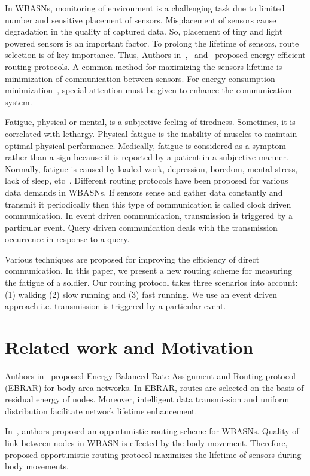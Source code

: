 \documentclass[journal]{IEEEtran}
\begin{document}
In WBASNs, monitoring of environment is a challenging task due to limited number and sensitive placement of sensors. Misplacement of sensors cause degradation
in the quality of captured data. So, placement of tiny and light powered sensors is an important factor. To prolong the lifetime of sensors, route selection is of
key importance. Thus, Authors in~\cite{1},~\cite{2} and~\cite{3} proposed energy efficient routing protocols. A common method for maximizing the sensors lifetime is
minimization of communication between sensors. For energy consumption minimization~\cite{4}, special attention must be given to enhance the communication system.

Fatigue, physical or mental, is a subjective feeling of tiredness. Sometimes, it is correlated with lethargy. Physical fatigue is the inability of muscles to
maintain optimal physical performance. Medically, fatigue is considered as a symptom rather than a sign because it is reported by a patient in a subjective manner.
Normally, fatigue is caused by loaded work, depression, boredom, mental stress, lack of sleep, etc~\cite{5}. Different routing protocols have been proposed for
 various data demands in WBASNs. If sensors sense and gather data constantly and transmit it periodically then this type of communication is called clock driven
 communication. In event driven communication, transmission is triggered by a particular event. Query driven communication deals with the transmission
occurrence in response to a query.

Various techniques are proposed for improving the efficiency of direct communication. In this paper, we present a new routing scheme for measuring the fatigue
 of a soldier. Our routing protocol takes three scenarios into account: (1) walking (2) slow running and (3) fast running. We use an event driven approach i.e.
 transmission is triggered by a particular event.


\section{Related work and Motivation}

Authors in~\cite{6} proposed Energy-Balanced Rate Assignment and Routing protocol (EBRAR) for body area networks. In EBRAR, routes are selected on the basis of
residual energy of nodes. Moreover, intelligent data transmission and uniform distribution facilitate network lifetime enhancement.

In~\cite{7}, authors proposed an opportunistic routing scheme for WBASNs. Quality of link between nodes in WBASN is effected by the body movement. Therefore,
proposed opportunistic routing protocol maximizes the lifetime of sensors during body movements.
\end{document}

